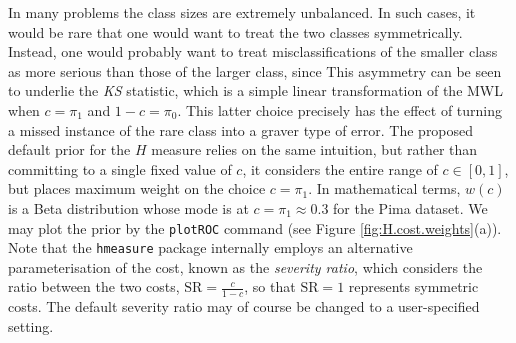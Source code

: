 \documentclass{article}
\begin{document}
In many problems the class sizes are extremely unbalanced. In such cases, it would be rare that one would want to treat the two classes symmetrically. Instead, one would probably want to treat misclassifications of the smaller class as more serious than those of the larger class, since  This asymmetry can be seen to underlie the \textit{KS} statistic, which is a simple linear transformation of the MWL when $c=\pi_1$ and $1-c = \pi_0$. This latter choice precisely has the effect of turning a missed instance of the rare class into a graver type of error. The proposed default prior for the $H$ measure relies on the same intuition, but rather than committing to a single fixed value of $c$, it considers the entire range of $c \in [0,1]$, but places  maximum weight on the choice $c=\pi_1$. In mathematical terms, $w(c)$ is a Beta distribution whose mode is at $c=\pi_1 \approx 0.3$ for the Pima dataset. We may plot the prior by the \verb+plotROC+ command (see Figure \ref{fig:H.cost.weights}(a)). Note that the \verb+hmeasure+ package internally employs an alternative parameterisation of the cost, known as the \emph{severity ratio}, which considers the ratio between the two costs, $\text{SR} = \frac{c}{1-c}$, so that $\text{SR} = 1$ represents symmetric costs. The default severity ratio may of course be changed to a user-specified setting.
\end{document}
